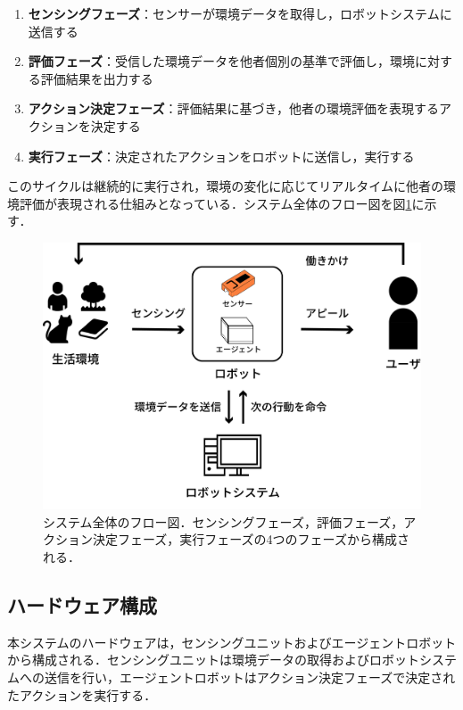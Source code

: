 \documentclass{cuxarticle}
\begin{document}
\begin{enumerate}
  \item \textbf{センシングフェーズ}：センサーが環境データを取得し，ロボットシステムに送信する
  \item \textbf{評価フェーズ}：受信した環境データを他者個別の基準で評価し，環境に対する評価結果を出力する
  \item \textbf{アクション決定フェーズ}：評価結果に基づき，他者の環境評価を表現するアクションを決定する
  \item \textbf{実行フェーズ}：決定されたアクションをロボットに送信し，実行する
\end{enumerate}

このサイクルは継続的に実行され，環境の変化に応じてリアルタイムに他者の環境評価が表現される仕組みとなっている．システム全体のフロー図を図\ref{fig:system-flow}に示す．

\begin{figure}[h]
  \centering
  \includegraphics[keepaspectratio, height=0.3\textheight]{resources/system-flow.png}
  \caption[short]{システム全体のフロー図．センシングフェーズ，評価フェーズ，アクション決定フェーズ，実行フェーズの4つのフェーズから構成される．}
  \label{fig:system-flow}
\end{figure}

\subsection{ハードウェア構成}
本システムのハードウェアは，センシングユニットおよびエージェントロボットから構成される．センシングユニットは環境データの取得およびロボットシステムへの送信を行い，エージェントロボットはアクション決定フェーズで決定されたアクションを実行する．
\end{document}
